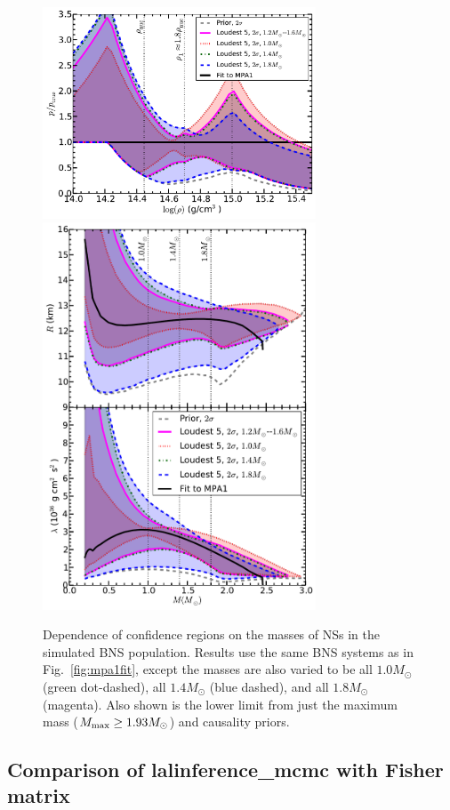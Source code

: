\documentclass[twocolumn,prd,amssymb,aps,nofootinbib,showpacs,epsf]{revtex4}
\begin{document}
\begin{figure}[!htb]
\begin{center}
\includegraphics[width=3.2in]{LALMCMCmpa1FitTaylorF2VaryMassperror.pdf}\\
\includegraphics[width=3.2in]{LALMCMCmpa1FitTaylorF2VaryMassRadiuslambda.pdf}
\caption{Dependence of confidence regions on the masses of NSs in the simulated BNS population. Results use the same BNS systems as in Fig.~\ref{fig:mpa1fit}, except the masses are also varied to be all $1.0M_\odot$ (green dot-dashed), all $1.4M_\odot$ (blue dashed), and all $1.8M_\odot$ (magenta). Also shown is the lower limit from just the maximum mass ($M_{\rm \max} \geq 1.93M_\odot$) and causality priors.}
\label{fig:popmass}
\end{center}
\end{figure}


\subsection{Comparison of lalinference\_mcmc with Fisher matrix}
\label{sec:fisher}
\end{document}
